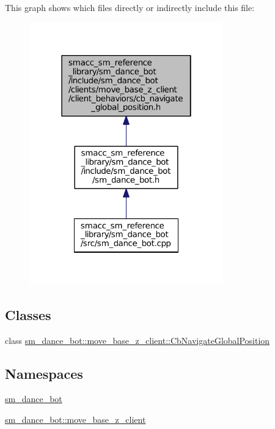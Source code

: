This graph shows which files directly or indirectly include this file\+:
\nopagebreak
\begin{figure}[H]
\begin{center}
\leavevmode
\includegraphics[width=238pt]{smacc__sm__reference__library_2sm__dance__bot_2include_2sm__dance__bot_2clients_2move__base__z__90d96ef2d47ced3a06d8bbe7ac4d0ab1}
\end{center}
\end{figure}
\subsection*{Classes}
\begin{DoxyCompactItemize}
\item 
class \hyperlink{classsm__dance__bot_1_1move__base__z__client_1_1CbNavigateGlobalPosition}{sm\+\_\+dance\+\_\+bot\+::move\+\_\+base\+\_\+z\+\_\+client\+::\+Cb\+Navigate\+Global\+Position}
\end{DoxyCompactItemize}
\subsection*{Namespaces}
\begin{DoxyCompactItemize}
\item 
 \hyperlink{namespacesm__dance__bot}{sm\+\_\+dance\+\_\+bot}
\item 
 \hyperlink{namespacesm__dance__bot_1_1move__base__z__client}{sm\+\_\+dance\+\_\+bot\+::move\+\_\+base\+\_\+z\+\_\+client}
\end{DoxyCompactItemize}
